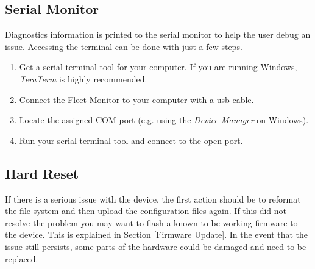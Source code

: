 \newpage

\subsection{Serial Monitor} \label{Serial Monitor}
Diagnostics information is printed to the serial monitor to help the user debug an issue. Accessing the terminal can be done with just a few steps.

\begin{enumerate}
  \item Get a serial terminal tool for your computer. If you are running Windows, \mbox{\textit{TeraTerm}} is highly recommended. 
  \item Connect the Fleet-Monitor to your computer with a \acrshort{usb} cable.
  \item Locate the assigned COM port (e.g. using the \textit{Device Manager} on Windows).
  \item Run your serial terminal tool and connect to the open port.
\end{enumerate}


\subsection{Hard Reset} \label{Hard Reset}
If there is a serious issue with the device, the first action should be to reformat the file system and then upload the configuration files again. If this did not resolve the problem you may want to flash a known to be working firmware to the device. This is explained in Section \ref{Firmware Update}. In the event that the issue still persists, some parts of the hardware could be damaged and need to be replaced.




